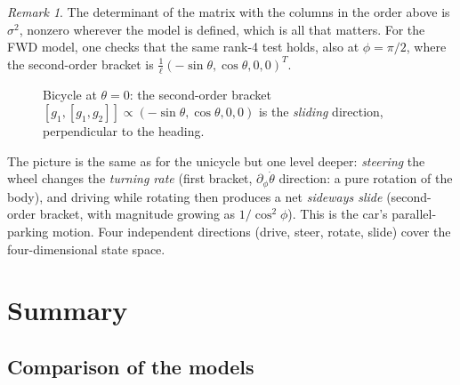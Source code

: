 \documentclass[11pt,a4paper]{article}
\newcommand{\LB}[2]{[#1,#2]}
\newcommand{\wheel}[3]{\begin{scope}[shift={#1},rotate=#2]
  \draw[fill=#3,rounded corners=1pt] (-0.4,-0.12) rectangle (0.4,0.12);\end{scope}}
\theoremstyle{definition}
\theoremstyle{plain}
\theoremstyle{remark}
\newtheorem*{remark}{Remark}
\begin{document}
\begin{remark}
The determinant of the matrix with the columns in the order above is $\sigma^2$, nonzero wherever the model is defined, which is all that matters.
For the FWD model, one checks that the same rank-4 test holds, also at $\phi=\pi/2$, where the second-order bracket is $\frac1\ell(-\sin\theta,\cos\theta,0,0)^T$.
\end{remark}

\begin{figure}[H]
\centering
{}
\caption{Bicycle at $\theta=0$: the second-order bracket $\LB{g_1}{\LB{g_1}{g_2}}\propto(-\sin\theta,\cos\theta,0,0)$ is the \emph{sliding} direction, perpendicular to the heading.}
\end{figure}

\begin{intuition}
The picture is the same as for the unicycle but one level deeper: \emph{steering} the wheel changes the \emph{turning rate} (first bracket, $\partial_\phi\dot\theta$ direction: a pure rotation of the body), and driving while rotating then produces a net \emph{sideways slide} (second-order bracket, with magnitude growing as $1/\cos^2\phi$). This is the car's parallel-parking motion. Four independent directions (drive, steer, rotate, slide) cover the four-dimensional state space.
\end{intuition}

\section{Summary}

\subsection{Comparison of the models}
\end{document}
